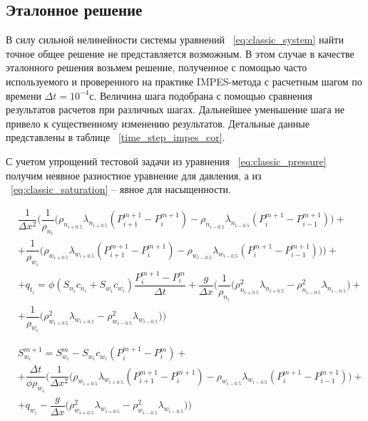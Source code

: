 \subsection{Эталонное решение}
\label{reference sample}
В силу сильной нелинейности системы уравнений ~\eqref{eq:classic_system} найти точное общее решение не представляется возможным.
В этом случае в качестве эталонного решения возьмем решение, полученное с помощью часто используемого и проверенного на практике IMPES-метода с расчетным шагом по
времени $\Delta t = 10^{-4}\text{с}$. Величина шага подобрана с помощью сравнения результатов расчетов при различных шагах.
Дальнейшее уменьшение шага не привело к существенному изменению результатов. Детальные данные представлены в таблице ~\ref{time_step_impes_cor}.

С учетом упрощений тестовой задачи из уравнения ~\eqref{eq:classic_pressure} получим неявное разностное уравнение для давления,
а из ~\eqref{eq:classic_saturation} -- явное для насыщенности.

\begin{equation} \label{eq:scheme_p}
 \begin{aligned} 
  & \dfrac{1}{\Delta x^2} \bigg(\dfrac{1}{\rho_{n_i}} \big( \rho_{n_{i+0.5}} \lambda_{n_{i+0.5}} (P_{i+1}^{m+1} - P_i^{m+1})
  - \rho_{n_{i-0.5}} \lambda_{n_{i-0.5}} (P_i^{m+1} - P_{i-1}^{m+1})\big) + \\
  &+ \dfrac{1}{\rho_{w_i}} \big( \rho_{w_{i+0.5}} \lambda_{w_{i+0.5}} (P_{i+1}^{m+1} - P_i^{m+1})
  - \rho_{w_{i-0.5}} \lambda_{w_{i-0.5}} (P_i^{m+1} - P_{i-1}^{m+1})\big)\bigg) + \\
  & + q_{t_i} = \phi(S_{n_i}c_{n_i}+S_{w_i}c_{w_i}) \dfrac{P_i^{m+1} - P_i^m}{\Delta t}
  + \dfrac{g}{\Delta x} \bigg(\dfrac{1}{\rho_{n_i}} \big( \rho_{n_{i+0.5}}^2 \lambda_{n_{i+0.5}} 
  - \rho_{n_{i-0.5}}^2 \lambda_{n_{i-0.5}} \big) + \\
  &+ \dfrac{1}{\rho_{w_i}} \big( \rho_{w_{i+0.5}}^2 \lambda_{w_{i+0.5}} 
  - \rho_{w_{i-0.5}}^2 \lambda_{w_{i-0.5}} \big)\bigg)
 \end{aligned}
\end{equation}

\begin{equation} \label{eq:scheme_s}
 \begin{aligned} 
  & S_{w_i}^{m+1} = S_{w_i}^{m} - S_{w_i}c_{w_i} (P_i^{m+1} - P_i^m) + \\
  & + \dfrac{\Delta t}{\phi\rho_{w_i}}\Bigg( \dfrac{1}{\Delta x^2} \bigg(\rho_{w_{i+0.5}} \lambda_{w_{i+0.5}} (P_{i+1}^{m+1} - P_i^{m+1})
  - \rho_{w_{i-0.5}} \lambda_{w_{i-0.5}} (P_i^{m+1} - P_{i-1}^{m+1}) \bigg) +\\
  & + q_{w_i} - \dfrac{g}{\Delta x} \bigg(\rho_{w_{i+0.5}}^2 \lambda_{w_{i+0.5}} - \rho_{w_{i-0.5}}^2 \lambda_{w_{i-0.5}} \bigg) \Bigg)
 \end{aligned}
\end{equation}

